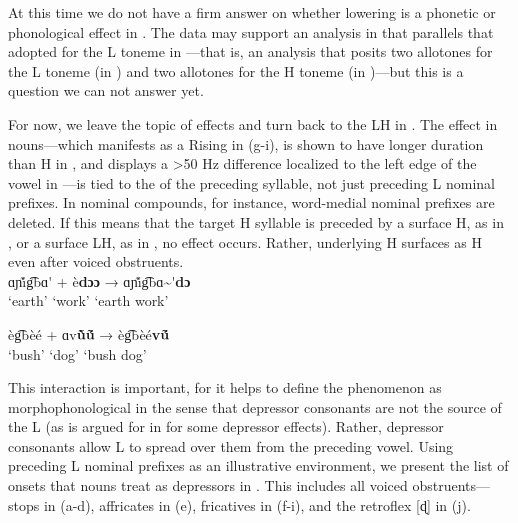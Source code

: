 \documentclass[output=paper
,newtxmath
,modfonts
,nonflat]{langsci/langscibook}
\begin{document}
At this time we do not have a firm answer on whether   lowering is a phonetic or phonological effect in . The data may support an analysis in  that parallels that adopted for the L toneme in —that is, an analysis that posits two allotones for the L toneme (in ) and two allotones for the H toneme (in )—but this is a question we can not answer yet. 

For now, we leave the topic of   effects and turn back to the LH  in . The  effect in nouns—which manifests as a Rising  in  (g-i), is shown to have longer duration than H in , and displays a >50 Hz  difference localized to the left edge of the vowel in —is tied to the  of the preceding syllable, not just preceding L  nominal prefixes. In nominal compounds, for instance, word-medial nominal prefixes are deleted. If this means that the target H  syllable is preceded by a surface H, as in , or a surface LH, as in , no  effect occurs. Rather, underlying H surfaces as H even after voiced obstruents. 
\\
\ea\label{ex:lotven:1}
    \gll ɑɲ\'{\~\i}g͡bɑ\'{} + è\textbf{dɔɔ} → ɑɲ\'{\~\i}g͡bɑ\~{}\'{}\textbf{dɔ}\\
    ‘earth’ {} ‘work’ {} {‘earth work’}     \\
    \glt 
    \z

\ea\label{ex:2}
    \gll èg͡bèé + ɑv\textbf{\`{\~u}ṹ} → èg͡bèé\textbf{vṹ}\\
    ‘bush’ {} ‘dog’ {} {‘bush dog’}\\
    \glt
    \z

               

          

This interaction is important, for it helps to define the phenomenon as morphophonological in the sense that depressor consonants are not the source of the L  (as is argued for in \citealt{Bradshaw1999} for some depressor effects). Rather, depressor consonants allow L  to spread over them from the preceding vowel. Using preceding L  nominal prefixes as an illustrative environment, we present the list of  onsets that nouns treat as depressors in . This includes all voiced obstruents—stops in (a-d), affricates in (e), fricatives in (f-i), and the retroflex [ɖ] in (j).
\end{document}
